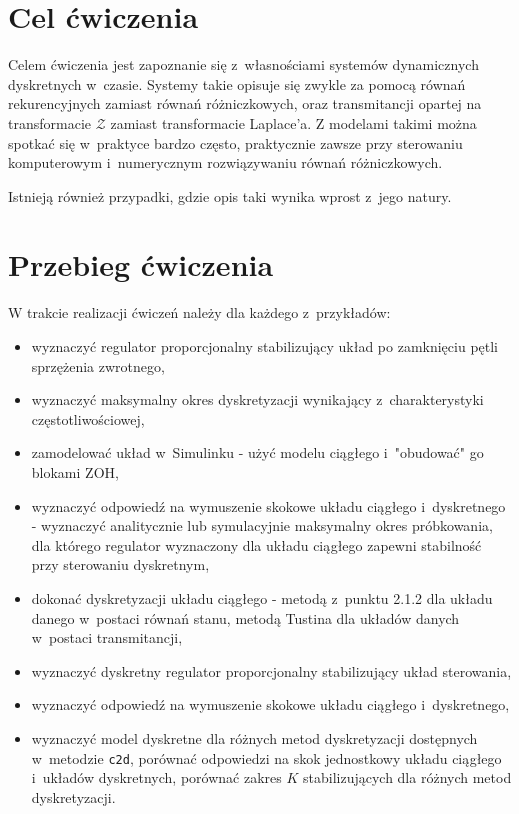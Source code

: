 \documentclass{sprawozdanie-agh}
\begin{document}

\stronatytulowa{}

\section{Cel ćwiczenia}
Celem ćwiczenia jest zapoznanie się z~własnościami systemów dynamicznych dyskretnych w~czasie.
Systemy takie opisuje się zwykle za pomocą równań rekurencyjnych zamiast równań różniczkowych, oraz transmitancji opartej na transformacie $\mathcal{Z}$ zamiast transformacie Laplace'a.
Z modelami takimi można spotkać się w~praktyce bardzo często, praktycznie zawsze przy sterowaniu komputerowym i~numerycznym rozwiązywaniu równań różniczkowych.

Istnieją również przypadki, gdzie opis taki wynika wprost z~jego natury.

\section{Przebieg ćwiczenia}
W trakcie realizacji ćwiczeń należy dla każdego z~przykładów:
\begin{itemize}
    \item wyznaczyć regulator proporcjonalny stabilizujący układ po zamknięciu pętli sprzężenia zwrotnego,
    \item wyznaczyć maksymalny okres dyskretyzacji wynikający z~charakterystyki częstotliwościowej,
    \item zamodelować układ w~Simulinku - użyć modelu ciągłego i~"obudować" go blokami ZOH,
    \item wyznaczyć odpowiedź na wymuszenie skokowe układu ciągłego i~dyskretnego - wyznaczyć analitycznie lub symulacyjnie maksymalny okres próbkowania, dla którego regulator wyznaczony dla układu ciągłego zapewni stabilność przy sterowaniu dyskretnym,
    \item dokonać dyskretyzacji układu ciągłego - metodą z~punktu 2.1.2 dla układu danego w~postaci równań stanu, metodą Tustina dla układów danych w~postaci transmitancji,
    \item wyznaczyć dyskretny regulator proporcjonalny stabilizujący układ sterowania,
    \item wyznaczyć odpowiedź na wymuszenie skokowe układu ciągłego i~dyskretnego,
    \item wyznaczyć model dyskretne dla różnych metod dyskretyzacji dostępnych w~metodzie \texttt{c2d}, porównać odpowiedzi na skok jednostkowy układu ciągłego i~układów dyskretnych, porównać zakres $K$ stabilizujących dla różnych metod dyskretyzacji.
\end{itemize}
\end{document}
